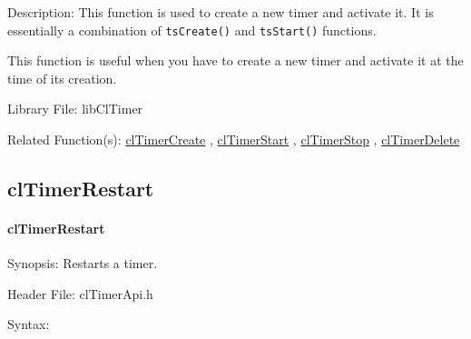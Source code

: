 \begin{flushleft}
\begin{Desc}
\end{Desc}
\begin{Desc}
\item[Description:]This function is used to create a new timer and activate it. It is essentially a combination of {\tt {ts\-Create()}} and 
{\tt {ts\-Start()}} functions. 
 \par
 This function is useful when you have to create a new timer and activate it at the time of its creation.\end{Desc}
\begin{Desc}
\item[Library File:]lib\-Cl\-Timer\end{Desc}
\begin{Desc}
\item[Related Function(s):]\hyperlink{group__group33}{cl\-Timer\-Create} , \hyperlink{group__group33}{cl\-Timer\-Start} , \hyperlink{group__group33}{cl\-Timer\-Stop} , \hyperlink{group__group33}{cl\-Timer\-Delete} \end{Desc}
\newpage

\subsection{clTimerRestart}
\hypertarget{pagetmr109}{}\paragraph{cl\-Timer\-Restart}\label{pagetmr109}
\begin{Desc}
\item[Synopsis:]Restarts a timer.\end{Desc}
\begin{Desc}
\item[Header File:]clTimerApi.h\end{Desc}
\begin{Desc}
\item[Syntax:]


\end{Desc}
\end{flushleft}
